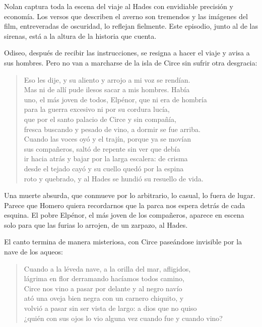 Nolan captura toda la escena del viaje al Hades con envidiable precisión y economía. Los versos que describen el averno son tremendos y las imágenes del film, entreveradas de oscuridad, lo reflejan fielmente. Este episodio, junto al de las sirenas, está a la altura de la historia que cuenta.

Odiseo, después de recibir las instrucciones, se resigna a hacer el viaje y avisa a sus hombres. Pero no van a marcharse de la isla de Circe sin sufrir otra desgracia:

\begin{verse}
Eso les dije, y su aliento y arrojo a mi voz se rendían.\\
Mas ni de allí pude ilesos sacar a mis hombres. Había\\
uno, el más joven de todos, Elpénor, que ni era de hombría\\
para la guerra excesivo ni por su cordura lucía,\\
que por el santo palacio de Circe y sin compañía,\\
fresca buscando y pesado de vino, a dormir se fue arriba.\\
Cuando las voces oyó y el trajín, porque ya se movían\\
sus compañeros, saltó de repente sin ver que debía\\
ir hacia atrás y bajar por la larga escalera: de crisma\\
desde el tejado cayó y su cuello quedó por la espina\\
roto y quebrado, y al Hades se hundió su resuello de vida.
\end{verse}

Una muerte absurda, que conmueve por lo arbitrario, lo casual, lo fuera de lugar. Parece que Homero quiera recordarnos que la parca nos espera detrás de cada esquina. El pobre Elpénor, el más joven de los compañeros, aparece en escena solo para que las furias lo arrojen, de un zarpazo, al Hades.

El canto termina de manera misteriosa, con Circe paseándose invisible por la nave de los aqueos:

\begin{verse}
Cuando a la léveda nave, a la orilla del mar, afligidos,\\
lágrima en flor derramando hacíamos todos camino,\\
Circe nos vino a pasar por delante y al negro navío\\
ató una oveja bien negra con un carnero chiquito, y\\
volvió a pasar sin ser vista de largo: a dios que no quiso\\
¿quién con sus ojos lo vio alguna vez cuando fue y cuando vino?
\end{verse}

